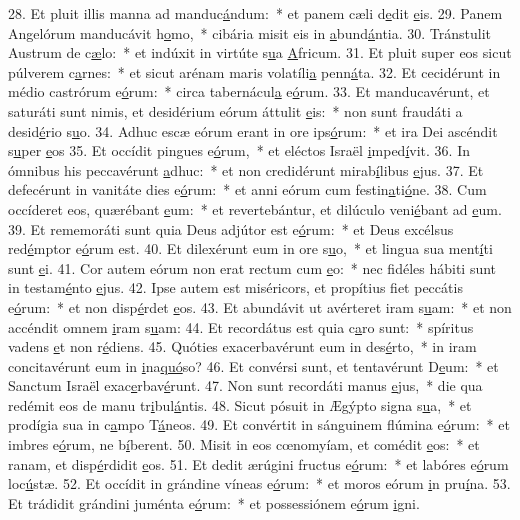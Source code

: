 28. Et pluit illis manna ad manduc\uline{á}ndum:~* et panem cæli d\uline{e}dit \uline{e}is.
29. Panem Angelórum manducávit h\uline{o}mo,~* cibária misit eis in \uline{a}bund\uline{á}ntia.
30. Tránstulit Austrum de c\uline{æ}lo:~* et indúxit in virtúte s\uline{u}a \uline{A}fricum.
31. Et pluit super eos sicut púlverem c\uline{a}rnes:~* et sicut arénam maris volatíli\uline{a} penn\uline{á}ta.
32. Et cecidérunt in médio castrórum e\uline{ó}rum:~* circa tabernácul\uline{a} e\uline{ó}rum.
33. Et manducavérunt, et saturáti sunt nimis, et desidérium eórum áttulit \uline{e}is:~* non sunt fraudáti a desid\uline{é}rio s\uline{u}o.
34. Adhuc escæ eórum erant in ore ips\uline{ó}rum:~* et ira Dei ascéndit s\uline{u}per \uline{e}os
35. Et occídit pingues e\uline{ó}rum,~* et eléctos Israël \uline{i}mped\uline{í}vit.
36. In ómnibus his peccavérunt \uline{a}dhuc:~* et non credidérunt mirab\uline{í}libus \uline{e}jus.
37. Et defecérunt in vanitáte dies e\uline{ó}rum:~* et anni eórum cum festin\uline{a}ti\uline{ó}ne.
38. Cum occíderet eos, quærébant \uline{e}um:~* et revertebántur, et dilúculo veni\uline{é}bant ad \uline{e}um.
39. Et rememoráti sunt quia Deus adjútor est e\uline{ó}rum:~* et Deus excélsus red\uline{é}mptor e\uline{ó}rum est.
40. Et dilexérunt eum in ore s\uline{u}o,~* et lingua sua ment\uline{í}ti sunt \uline{e}i.
41. Cor autem eórum non erat rectum cum \uline{e}o:~* nec fidéles hábiti sunt in testam\uline{é}nto \uline{e}jus.
42. Ipse autem est miséricors, et propítius fiet peccátis e\uline{ó}rum:~* et non disp\uline{é}rdet \uline{e}os.
43. Et abundávit ut avérteret iram s\uline{u}am:~* et non accéndit omnem \uline{i}ram s\uline{u}am:
44. Et recordátus est quia c\uline{a}ro sunt:~* spíritus vadens \uline{e}t non r\uline{é}diens.
45. Quóties exacerbavérunt eum in des\uline{é}rto,~* in iram concitavérunt eum in \uline{i}na\uline{quó}so?
46. Et convérsi sunt, et tentavérunt D\uline{e}um:~* et Sanctum Israël exac\uline{e}rbav\uline{é}runt.
47. Non sunt recordáti manus \uline{e}jus,~* die qua redémit eos de manu tr\uline{i}bul\uline{á}ntis.
48. Sicut pósuit in Ægýpto signa s\uline{u}a,~* et prodígia sua in c\uline{a}mpo T\uline{á}neos.
49. Et convértit in sánguinem flúmina e\uline{ó}rum:~* et imbres e\uline{ó}rum, ne b\uline{í}berent.
50. Misit in eos cœnomyíam, et comédit \uline{e}os:~* et ranam, et disp\uline{é}rdidit \uline{e}os.
51. Et dedit ærúgini fructus e\uline{ó}rum:~* et labóres e\uline{ó}rum loc\uline{ú}stæ.
52. Et occídit in grándine víneas e\uline{ó}rum:~* et moros eórum \uline{i}n pru\uline{í}na.
53. Et trádidit grándini juménta e\uline{ó}rum:~* et possessiónem e\uline{ó}rum \uline{i}gni.
